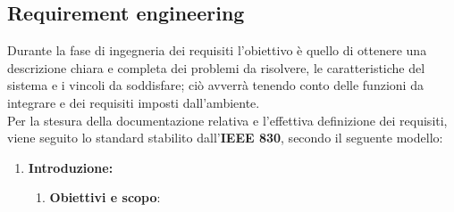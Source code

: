 \documentclass[a4paper,12pt]{article}
\begin{document}
\subsection{Requirement engineering}
Durante la fase di ingegneria dei requisiti l’obiettivo è quello di ottenere una descrizione chiara e completa dei problemi da risolvere, le caratteristiche del sistema e i vincoli da soddisfare; ciò avverrà tenendo conto delle funzioni da integrare e dei requisiti imposti dall’ambiente.\\ Per la stesura della documentazione relativa e l’effettiva definizione dei requisiti, viene seguito lo standard stabilito dall’\textbf{IEEE 830}, secondo il seguente modello: \\
\begin{enumerate}
\item \textbf{Introduzione:}
    \begin{enumerate}
    
    \item \textbf{Obiettivi e scopo}:\\


\end{enumerate}
\end{enumerate}
\end{document}
